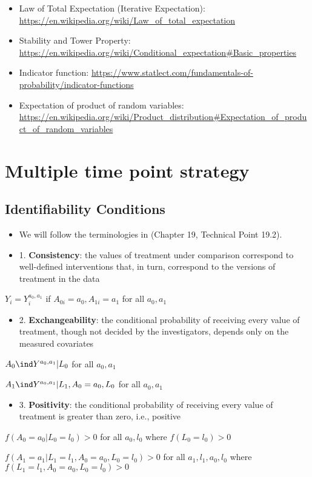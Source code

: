 \documentclass[dvipdfmx,10pt]{article}
\begin{document}
\begin{itemize}
\item Law of Total Expectation (Iterative Expectation): \url{https://en.wikipedia.org/wiki/Law\_of\_total\_expectation}
\item Stability and Tower Property: \url{https://en.wikipedia.org/wiki/Conditional\_expectation\#Basic\_properties}
\item Indicator function: \url{https://www.statlect.com/fundamentals-of-probability/indicator-functions}
\item Expectation of product of random variables: \url{https://en.wikipedia.org/wiki/Product\_distribution\#Expectation\_of\_product\_of\_random\_variables}
\end{itemize}

\section{Multiple time point strategy}
\label{sec:orgdf55f13}
\subsection{Identifiability Conditions}
\label{sec:org310e42f}
\begin{itemize}
\item We will follow the terminologies in \cite{hernanCausalInference2019} (Chapter 19, Technical Point 19.2).
\item 1. \textbf{Consistency}: the values of treatment under comparison correspond to well-defined interventions that, in turn, correspond to the versions of treatment in the data
\end{itemize}
\begin{center}
\(Y_{i} = Y_{i}^{a_{0},a_{1}}\) if \(A_{0i} = a_{0}, A_{1i} = a_{1}\) for all \(a_{0},a_{1}\)
\end{center}
\begin{itemize}
\item 2. \textbf{Exchangeability}: the conditional probability of receiving every value of treatment, though not decided by the investigators, depends only on the measured covariates
\end{itemize}
\begin{center}
\(A_{0} \ind Y^{a_{0},a_{1}} | L_{0}\) for all \(a_{0},a_{1}\)

\(A_{1} \ind Y^{a_{0},a_{1}} | L_{1},A_{0}=a_{0},L_{0}\) for all \(a_{0},a_{1}\)
\end{center}
\begin{itemize}
\item 3. \textbf{Positivity}: the conditional probability of receiving every value of treatment is greater than zero, i.e., positive
\end{itemize}
\begin{center}
\(f(A_{0} = a_{0} | L_{0} = l_{0}) > 0\) for all \(a_{0},l_{0}\) where \(f(L_{0} = l_{0}) > 0\)

\(f(A_{1} = a_{1} | L_{1} = l_{1}, A_{0} = a_{0}, L_{0} = l_{0}) > 0\) for all \(a_{1},l_{1},a_{0},l_{0}\) where \(f(L_{1} = l_{1}, A_{0} = a_{0}, L_{0} = l_{0}) > 0\)
\end{center}
\end{document}

